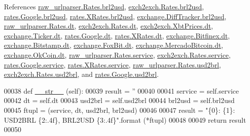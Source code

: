 References \hyperlink{raw__urlparser_8py_source_l00026}{raw\+\_\+urlparser.\+Rates.\+brl2usd}, \hyperlink{exch2exch_8py_source_l00030}{exch2exch.\+Rates.\+brl2usd}, \hyperlink{rates_8py_source_l00092}{rates.\+Google.\+brl2usd}, \hyperlink{rates_8py_source_l00147}{rates.\+X\+Rates.\+brl2usd}, \hyperlink{exchange_8py_source_l00292}{exchange.\+Diff\+Tracker.\+brl2usd}, \hyperlink{raw__urlparser_8py_source_l00024}{raw\+\_\+urlparser.\+Rates.\+dt}, \hyperlink{exch2exch_8py_source_l00028}{exch2exch.\+Rates.\+dt}, \hyperlink{exch2exch_8py_source_l00057}{exch2exch.\+Xbt\+Prices.\+dt}, \hyperlink{exchange_8py_source_l00059}{exchange.\+Ticker.\+dt}, \hyperlink{rates_8py_source_l00089}{rates.\+Google.\+dt}, \hyperlink{rates_8py_source_l00145}{rates.\+X\+Rates.\+dt}, \hyperlink{exchange_8py_source_l00437}{exchange.\+Bitfinex.\+dt}, \hyperlink{exchange_8py_source_l00509}{exchange.\+Bitstamp.\+dt}, \hyperlink{exchange_8py_source_l00573}{exchange.\+Fox\+Bit.\+dt}, \hyperlink{exchange_8py_source_l00649}{exchange.\+Mercado\+Bitcoin.\+dt}, \hyperlink{exchange_8py_source_l00714}{exchange.\+Ok\+Coin.\+dt}, \hyperlink{raw__urlparser_8py_source_l00027}{raw\+\_\+urlparser.\+Rates.\+service}, \hyperlink{exch2exch_8py_source_l00031}{exch2exch.\+Rates.\+service}, \hyperlink{rates_8py_source_l00094}{rates.\+Google.\+service}, \hyperlink{rates_8py_source_l00149}{rates.\+X\+Rates.\+service}, \hyperlink{raw__urlparser_8py_source_l00025}{raw\+\_\+urlparser.\+Rates.\+usd2brl}, \hyperlink{exch2exch_8py_source_l00029}{exch2exch.\+Rates.\+usd2brl}, and \hyperlink{rates_8py_source_l00091}{rates.\+Google.\+usd2brl}.


\begin{DoxyCode}
00038     \textcolor{keyword}{def }\hyperlink{namespacerates_a2f1a70c33ee9e255938e4c19fd207264}{\_\_str\_\_} (self):
00039         result = \textcolor{stringliteral}{''}
00040 
00041         service = self.service
00042         dt      = self.dt
00043         usd2brl = self.usd2brl
00044         brl2usd = self.brl2usd
00045         ftupl = (service, dt, usd2brl, brl2usd)
00046         
00047         result = \textcolor{stringliteral}{"\{0\}: \{1\}: USD2BRL \{2:.4f\}, BRL2USD \{3:.4f\}"}.format (*ftupl)
00048 
00049         \textcolor{keywordflow}{return} result        
00050         
\end{DoxyCode}
\mbox{\label{classraw__urlparser_1_1_rates_a28e3ff2d763165bfa725b8c4954722f7}} 
